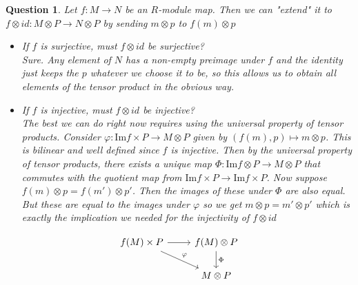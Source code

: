 \documentclass[a4paper]{article}
\newtheorem{que}[thm]{Question}
\begin{document}
\begin{que}
    Let $f:M\to N$ be an $R$-module map. Then we can  "extend" it to $f\otimes id : M\otimes P\to N\otimes P$ by sending $m\otimes p$ to $f(m)\otimes p$
    \begin{itemize}
        \item If $f$ is surjective, must $f\otimes id$ be surjective?\\
            Sure. Any element of $N$ has a non-empty preimage under $f$ and the identity just keeps the $p$ whatever we choose it to be, so this allows us to obtain all elements of the tensor product in the obvious way.
        \item If $f$ is injective, must $f\otimes id$ be injective?\\
            The best we can do right now requires using the universal property of tensor products. Consider $\varphi:\text{Im}f\times P\to M\otimes P$ given by $\left( f(m),p \right)\mapsto m\otimes p $. This is bilinear and well defined since $f$ is injective. Then by the universal property of tensor products, there exists a unique map $\Phi:\text{Im}f\otimes P\to M\otimes P$ that commutes with the quotient map from  $\text{Im}f\times P\to \text{Im}f\times P$. Now suppose $f(m)\otimes p=f(m')\otimes p'$. Then the images of these under $\Phi$ are also equal. But these are equal to the images under $\varphi$ so we get $m\otimes p=m'\otimes p'$ which is exactly the implication we needed for the injectivity of $f\otimes id$ 
    \end{itemize}
    \[\begin{tikzcd}
        f(M)\times P\arrow[r] \arrow[rd,"\varphi"] & \arrow[d,"\Phi"]f(M)\otimes P\\ & M\otimes P
    \end{tikzcd}\]
\end{que}
\end{document}
